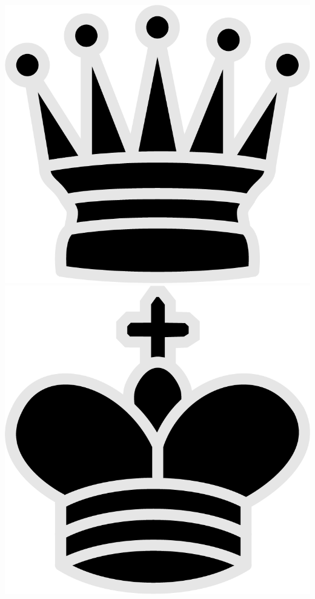 \documentclass{article}
\begin{document}
\begin{center}
	\includegraphics[scale=0.07]{image14}   
	\includegraphics[scale=0.07]{image9}    


\end{center}
\end{document}

